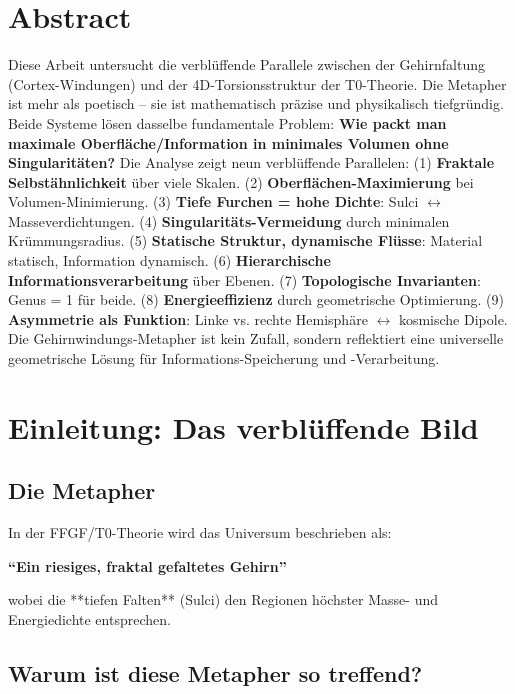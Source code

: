 \section*{Abstract}
		Diese Arbeit untersucht die verblüffende Parallele zwischen der Gehirnfaltung (Cortex-Windungen) und der 4D-Torsionsstruktur der T0-Theorie. Die Metapher ist mehr als poetisch -- sie ist mathematisch präzise und physikalisch tiefgründig. Beide Systeme lösen dasselbe fundamentale Problem: \textbf{Wie packt man maximale Oberfläche/Information in minimales Volumen ohne Singularitäten?} Die Analyse zeigt neun verblüffende Parallelen: (1) \textbf{Fraktale Selbstähnlichkeit} über viele Skalen. (2) \textbf{Oberflächen-Maximierung} bei Volumen-Minimierung. (3) \textbf{Tiefe Furchen = hohe Dichte}: Sulci $\leftrightarrow$ Masseverdichtungen. (4) \textbf{Singularitäts-Vermeidung} durch minimalen Krümmungsradius. (5) \textbf{Statische Struktur, dynamische Flüsse}: Material statisch, Information dynamisch. (6) \textbf{Hierarchische Informationsverarbeitung} über Ebenen. (7) \textbf{Topologische Invarianten}: Genus = 1 für beide. (8) \textbf{Energieeffizienz} durch geometrische Optimierung. (9) \textbf{Asymmetrie als Funktion}: Linke vs. rechte Hemisphäre $\leftrightarrow$ kosmische Dipole. Die Gehirnwindungs-Metapher ist kein Zufall, sondern reflektiert eine universelle geometrische Lösung für Informations-Speicherung und -Verarbeitung.

	
	
	
	\section{Einleitung: Das verblüffende Bild}
	
	\subsection{Die Metapher}
	
	In der FFGF/T0-Theorie wird das Universum beschrieben als:
	
	\begin{center}
		\textbf{\enquote{Ein riesiges, fraktal gefaltetes Gehirn}}
	\end{center}
	
	wobei die **tiefen Falten** (Sulci) den Regionen höchster Masse- und Energiedichte entsprechen.
	
	\subsection{Warum ist diese Metapher so treffend?}
	
